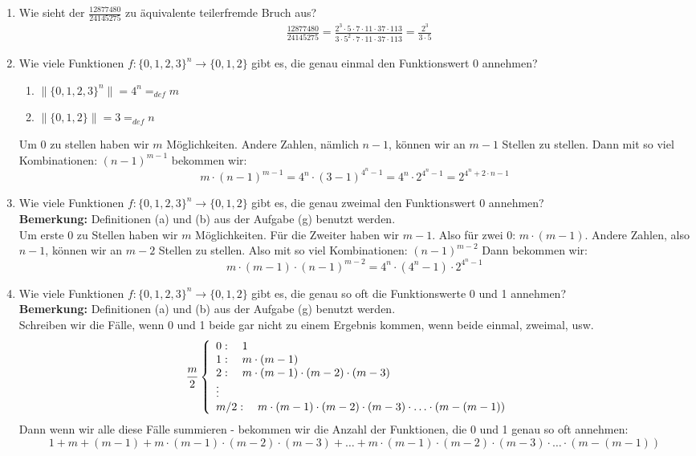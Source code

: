 \begin{enumerate}[label=(\alph*)]
		\item Wie sieht der $\frac{12877480}{24145275}$ zu äquivalente teilerfremde Bruch aus?
		\begin{align*}
			& \frac{12877480}{24145275} = \frac{2^3 \cdot 5 \cdot 7 \cdot 11 \cdot 37 \cdot 113}
			{3 \cdot 5^2 \cdot 7 \cdot 11 \cdot 37 \cdot 113} = \frac{2^3}{3 \cdot 5}
		\end{align*}

		\item Wie viele Funktionen $f : \{0, 1, 2, 3\}^n \to \{0, 1, 2\}$ gibt es, die genau einmal den Funktionswert 0 annehmen?
		\begin{enumerate}
			\item $\|\{0,1,2,3\}^n\| = 4^n =_{def}m$
			\item $\|\{0,1,2\}\| = 3 =_{def}n$
		\end{enumerate}
		Um 0 zu stellen haben wir $m$ Möglichkeiten. Andere Zahlen, nämlich $n-1$, können wir
		an $m-1$ Stellen zu stellen. Dann mit so viel Kombinationen: $(n-1)^{m-1}$
		bekommen wir: 
		\[m\cdot(n-1)^{m-1} = 4^n\cdot(3-1)^{4^n-1} = 4^n\cdot2^{4^n-1} = 2^{4^n+2\cdot n-1}\]

		\item Wie viele Funktionen $f : \{0, 1, 2, 3\}^n \to \{0, 1, 2\}$ gibt es, die genau zweimal den Funktionswert 0 annehmen? \\
		\textbf{Bemerkung:} Definitionen (a) und (b) aus der Aufgabe (g) benutzt werden. \\
		Um erste 0 zu Stellen haben wir $m$ Möglichkeiten. Für die Zweiter haben wir $m-1$.
		Also für zwei 0: $m\cdot (m-1)$. Andere Zahlen, also $n-1$, können wir
		an $m-2$ Stellen zu stellen. Also mit so viel Kombinationen: $(n-1)^{m-2}$
		Dann bekommen wir:
		\[m\cdot(m-1)\cdot(n-1)^{m-2} = 4^n\cdot(4^n-1)\cdot2^{4^n-1}\] 

		\item Wie viele Funktionen $f : \{0, 1, 2, 3\}^n \to \{0, 1, 2\}$ gibt es, die genau so oft die Funktionswerte 0 und 1 annehmen? \\
		\textbf{Bemerkung:} Definitionen (a) und (b) aus der Aufgabe (g) benutzt werden. \\
		Schreiben wir die Fälle, wenn 0 und 1 beide gar nicht zu einem Ergebnis kommen, wenn beide einmal, zweimal, usw.
		\[ \frac{m}{2} \left\{ 
			\begin{array}{l l}
		   		0: \quad 1  & \\
		    	1: \quad m\cdot(m-1) & \\
		    	2: \quad m\cdot(m-1)\cdot(m-2)\cdot(m-3) & \\
		    		\vdots \\
		    	m/2: \quad m\cdot(m-1)\cdot(m-2)\cdot(m-3)\cdot \ldots \cdot(m-(m-1))& 
		  	\end{array} 
		\right.\]
		Dann wenn wir alle diese Fälle summieren - bekommen wir die Anzahl der Funktionen, die 0 und 1 genau so oft annehmen:
		\[1 + m+(m-1) + m\cdot(m-1)\cdot(m-2)\cdot (m-3)+ \ldots + m\cdot(m-1)\cdot(m-2)\cdot(m-3)\cdot \ldots \cdot(m-(m-1))\]


\end{enumerate}
